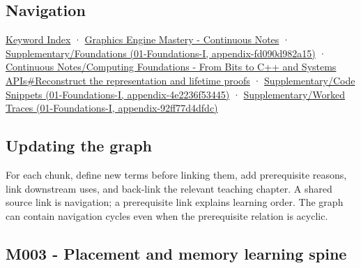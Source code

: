 \subsection{Navigation}\label{navigation}

\hyperref[appendix-a6d556a4ef50]{Keyword Index} · \href{Graphics\%20Engine\%20Mastery\%20-\%20Continuous\%20Notes}{Graphics Engine Mastery - Continuous Notes} · \href{}{Supplementary/Foundations (01-Foundations-I, appendix-fd090d982a15)} · \href{Continuous\%20Notes/Computing\%20Foundations\%20-\%20From\%20Bits\%20to\%20C++\%20and\%20Systems\%20APIs\#Reconstruct\%20the\%20representation\%20and\%20lifetime\%20proofs}{Continuous Notes/Computing Foundations - From Bits to C++ and Systems APIs\#Reconstruct the representation and lifetime proofs} · \href{}{Supplementary/Code Snippets (01-Foundations-I, appendix-4e2236f53445)} · \href{}{Supplementary/Worked Traces (01-Foundations-I, appendix-92ff77d4dfdc)}

\subsection{Updating the graph}\label{updating-the-graph}

For each chunk, define new terms before linking them, add prerequisite reasons, link downstream uses, and back-link the relevant teaching chapter. A shared source link is navigation; a prerequisite link explains learning order. The graph can contain navigation cycles even when the prerequisite relation is acyclic.

\subsection{M003 - Placement and memory learning spine}\label{m003---placement-and-memory-learning-spine}

